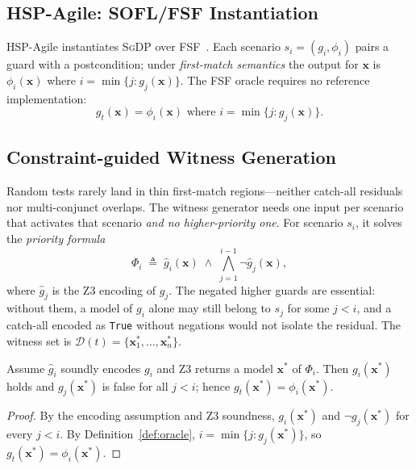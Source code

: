\subsection{HSP-Agile: SOFL/FSF Instantiation}
\label{subsec:hsp-agile}

HSP-Agile instantiates \textsc{SgDP} over FSF~\cite{liu2004soflbook,li2022qrs_companion}.
Each scenario $s_i = (g_i, \phi_i)$ pairs a guard with a postcondition; under
\emph{first-match semantics} the output for $\mathbf{x}$ is $\phi_i(\mathbf{x})$ where
$i = \min\{j : g_j(\mathbf{x})\}$.
The FSF oracle requires no reference implementation:
\begin{equation}
  g_t(\mathbf{x}) = \phi_i(\mathbf{x}) \text{ where } i = \min\{j : g_j(\mathbf{x})\}.
\end{equation}

\subsection{Constraint-guided Witness Generation}
\label{subsec:witness-gen}

Random tests rarely land in thin first-match regions---neither catch-all
residuals nor multi-conjunct overlaps.
The witness generator needs one input per scenario that activates
that scenario \emph{and no higher-priority one}.
For scenario $s_i$, it solves the \emph{priority formula}
\begin{equation}
  \label{eq:priority}
  \Phi_i \;\triangleq\; \hat{g}_i(\mathbf{x}) \;\land\; \bigwedge_{j=1}^{i-1} \lnot\hat{g}_j(\mathbf{x}),
\end{equation}
where $\hat{g}_j$ is the Z3 encoding of $g_j$.
The negated higher guards are essential: without them, a model of $g_i$
alone may still belong to $s_j$ for some $j<i$, and a catch-all encoded as
\texttt{True} without negations would not isolate the residual.
The witness set is $\mathcal{D}(t) = \{\mathbf{x}_1^*, \ldots, \mathbf{x}_n^*\}$.

\begin{proposition}
\label{thm:witness-soundness}
Assume $\hat{g}_i$ soundly encodes $g_i$ and Z3 returns a model $\mathbf{x}^*$ of
$\Phi_i$.
Then $g_i(\mathbf{x}^*)$ holds and $g_j(\mathbf{x}^*)$ is false for all $j < i$;
hence $g_t(\mathbf{x}^*) = \phi_i(\mathbf{x}^*)$.
\end{proposition}
\begin{proof}
By the encoding assumption and Z3 soundness,
$g_i(\mathbf{x}^*)$ and $\lnot g_j(\mathbf{x}^*)$ for every $j<i$.
By Definition~\ref{def:oracle},
$i=\min\{j:g_j(\mathbf{x}^*)\}$, so
$g_t(\mathbf{x}^*)=\phi_i(\mathbf{x}^*)$.
\end{proof}


